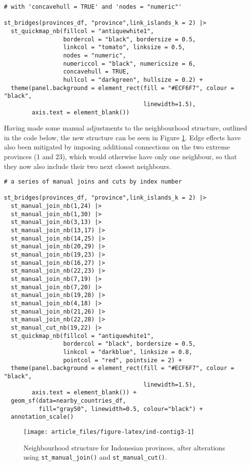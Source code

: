 \begin{verbatim}
# with 'concavehull = TRUE' and 'nodes = "numeric"'

st_bridges(provinces_df, "province",link_islands_k = 2) |> 
  st_quickmap_nb(fillcol = "antiquewhite1", 
                 bordercol = "black", bordersize = 0.5, 
                 linkcol = "tomato", linksize = 0.5, 
                 nodes = "numeric", 
                 numericcol = "black", numericsize = 6, 
                 concavehull = TRUE, 
                 hullcol = "darkgreen", hullsize = 0.2) + 
  theme(panel.background = element_rect(fill = "#ECF6F7", colour = "black", 
                                        linewidth=1.5),
        axis.text = element_blank())
\end{verbatim}

Having made some manual adjustments to the neighbourhood structure, outlined in the code below, the
new structure can be seen in Figure \ref{fig:ind-contig3}. Edge effects
have also been mitigated by imposing additional connections on the two extreme
provinces (1 and 23), which would otherwise have only one neighbour, so that they now also include
their two next closest neighbours.



\begin{verbatim}
# a series of manual joins and cuts by index number

st_bridges(provinces_df, "province",link_islands_k = 2) |> 
  st_manual_join_nb(1,24) |> 
  st_manual_join_nb(1,30) |> 
  st_manual_join_nb(3,13) |> 
  st_manual_join_nb(13,17) |> 
  st_manual_join_nb(14,25) |> 
  st_manual_join_nb(20,29) |>
  st_manual_join_nb(19,23) |> 
  st_manual_join_nb(16,27) |> 
  st_manual_join_nb(22,23) |> 
  st_manual_join_nb(7,19) |> 
  st_manual_join_nb(7,20) |>
  st_manual_join_nb(19,28) |> 
  st_manual_join_nb(4,18) |> 
  st_manual_join_nb(21,26) |> 
  st_manual_join_nb(22,28) |> 
  st_manual_cut_nb(19,22) |> 
  st_quickmap_nb(fillcol = "antiquewhite1", 
                 bordercol = "black", bordersize = 0.5, 
                 linkcol = "darkblue", linksize = 0.8, 
                 pointcol = "red", pointsize = 2) + 
  theme(panel.background = element_rect(fill = "#ECF6F7", colour = "black", 
                                        linewidth=1.5),
        axis.text = element_blank()) +
  geom_sf(data=nearby_countries_df, 
          fill="gray50", linewidth=0.5, colour="black") + 
  annotation_scale()
\end{verbatim}

\begin{figure}

{\centering \texttt{[image: article\_files/figure-latex/ind-contig3-1]} 

}

\caption{Neighbourhood structure for Indonesian provinces, after alterations using \texttt{st\_manual\_join()} and \texttt{st\_manual\_cut()}.}\label{fig:ind-contig3}
\end{figure}


